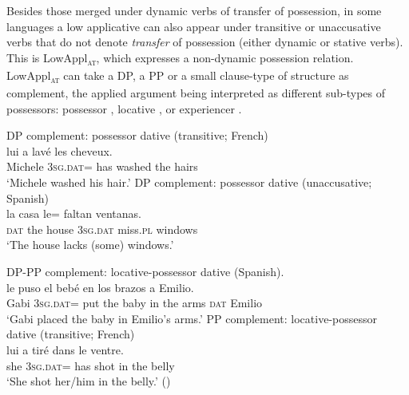 \documentclass[output=paper,colorlinks,citecolor=brown,nonflat]{./langscibook}
\begin{document}
Besides those merged under dynamic verbs of transfer of possession, in some languages a low applicative can also appear under transitive or unaccusative verbs that do not denote \textit{transfer} of possession (either dynamic or stative verbs). This is  LowAppl\textsc{\textsubscript{at}}, which expresses a non-dynamic possession relation. LowAppl\textsc{\textsubscript{at}} can take  a DP, a PP or a small clause-type of structure as complement, the applied argument being interpreted as different sub-types of possessors: possessor , locative , or experiencer . 

\ea%
    \label{ex:cuervo:6}
    \ea%
        \label{ex:cuervo:6a}
        DP complement: possessor dative (transitive; French)\\
         {lui} {a} {lavé} {les} {cheveux}.\\
        Michele 3\textsc{sg.dat}= has washed the hairs\\
        \glt ‘Michele washed his hair.’
    \ex%
        \label{ex:cuervo:6b}
        DP complement: possessor dative (unaccusative; Spanish)\\
         {la} {casa} {le}= {faltan} {ventanas}.\\
        \textsc{dat} the house 3\textsc{sg.dat} miss.\textsc{pl} windows\\
        \glt ‘The house lacks (some) windows.’
    \z
\z

\ea%
    \label{ex:cuervo:7}
    \ea%
        \label{ex:cuervo:7a}
        DP-PP complement: locative-possessor dative (Spanish).\\
         {le} {puso} {el} {bebé}  {en} {los} {brazos} {a} {Emilio}.\\
        Gabi 3\textsc{sg.dat}= put the baby in the arms \textsc{dat} Emilio \\
        \glt ‘Gabi placed the baby in Emilio’s arms.’
    \ex%
        \label{ex:cuervo:7b}
        PP complement: locative-possessor dative (transitive; French)\\
         {lui} {a} {tiré} {dans} {le} {ventre}.\\
        she 3\textsc{sg.dat}= has shot in the belly\\
        \glt ‘She shot her/him in the belly.’  (\citealt{BonehNash2012})
    \z
\z
\end{document}

